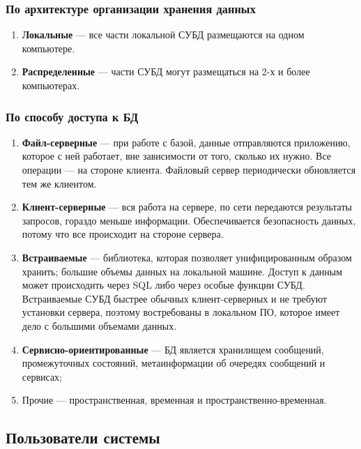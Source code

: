 \subsubsection{По архитектуре организации хранения данных}

\begin{enumerate}[label=\arabic*.]
	\item \textbf{Локальные} --- все части локальной СУБД размещаются на одном компьютере.
	\item \textbf{Распределенные} --- части СУБД могут размещаться на 2-х и более компьютерах. 
\end{enumerate}

\subsubsection{По способу доступа к БД}

\begin{enumerate}[label=\arabic*.]
	\item \textbf{Файл-серверные} --- при работе с базой, данные отправляются приложению, которое с ней работает, вне зависимости от того, сколько их нужно. Все операции --- на стороне клиента. Файловый сервер периодически обновляется тем же клиентом.
	\item \textbf{Клиент-серверные} --- вся работа на сервере, по сети передаются результаты запросов, гораздо меньше информации. Обеспечивается безопасность данных, потому что все происходит на стороне сервера.
	\item \textbf{Встраиваемые} --- библиотека, которая позволяет унифицированным образом хранить;
	большие объемы данных на локальной машине. Доступ к данным может происходить через SQL либо через 
	особые функции СУБД. Встраиваемые СУБД быстрее обычных клиент-серверных и не требуют установки
	сервера, поэтому востребованы в локальном ПО, которое имеет дело с большими объемами данных.
	\item \textbf{Сервисно-ориентированные} --- БД является хранилищем сообщений, промежуточных состояний, метаинформации об очередях сообщений и сервисах;
	\item Прочие --- пространственная, временная и пространственно-временная.
\end{enumerate}



\subsection{Пользователи системы}

